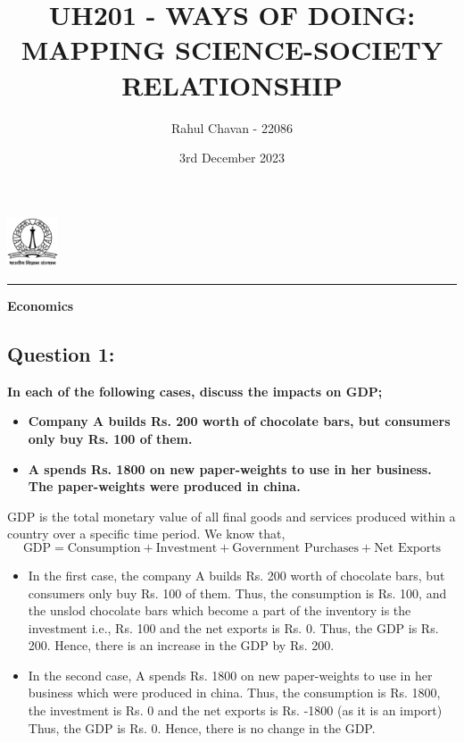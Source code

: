 \documentclass{article}
\title{\textbf{UH201 - WAYS OF DOING: MAPPING SCIENCE-SOCIETY RELATIONSHIP}}
\author{Rahul Chavan - 22086}
\date{3rd December 2023}
\renewcommand{\maketitle}{
 \begin{center}
    \includegraphics[width=1.5cm]{IISc_Master_Seal_Black.jpg}
    \vspace{0.5cm}

    \Large
    \textbf{\thetitle}
    
    \vspace{0.3cm}
    
    \large
    \theauthor
    
    \vspace{0.2cm}

    
    
    \large
    \thedate
    \vspace{0.2cm}

    \hrule  
    
    
  
  \end{center}
}
\begin{document}
\maketitle
  \begin{center} \Large
    \textbf{Economics}
  \end{center} 

\subsection*{Question 1:}
\textbf{In each of the following cases, discuss the impacts on GDP;}
\begin{itemize}
    \item \textbf{Company A builds Rs. 200 worth of chocolate bars, but consumers only buy Rs. 100 of them.}
    \item \textbf{A spends Rs. 1800 on new paper-weights to use in her business. The paper-weights were produced in china.}
\end{itemize}
GDP is the total monetary value of all final goods and services produced within a country over a specific time period.
We know that,
\begin{equation}
    \text{GDP} = \text{Consumption} + \text{Investment} + \text{Government Purchases} + \text{Net Exports}
\end{equation}

\begin{itemize}
    \item In the first case, the company A builds Rs. 200 worth of chocolate bars, but consumers only buy Rs. 100 of them.
          Thus, the consumption is Rs. 100, and the unslod chocolate bars which become a part of the inventory is the investment i.e., Rs. 100 and the net exports is Rs. 0.
          Thus, the GDP is Rs. 200.
          Hence, there is an increase in the GDP by Rs. 200.
    \item In the second case, A spends Rs. 1800 on new paper-weights to use in her business which were produced in china.
          Thus, the consumption is Rs. 1800, the investment is Rs. 0 and the net exports is Rs. -1800 (as it is an import)
          Thus, the GDP is Rs. 0.
          Hence, there is no change in the GDP.
\end{itemize}
\end{document}
